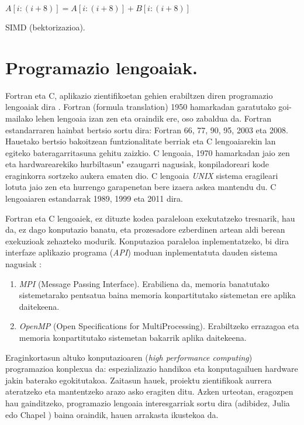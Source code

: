 \begin{algorithm}[H]
 \BlankLine
  {
   \BlankLine
    $A[i:(i+8)]=A[i:(i+8)]+B[i:(i+8)]$\;
   \BlankLine
  }
 \caption{SIMD (bektorizazioa).}
\end{algorithm}


\section{Programazio lengoaiak.}

Fortran eta C, aplikazio zientifikoetan gehien erabiltzen diren programazio lengoaiak dira \cite{Higham2015}. Fortran (formula translation) 1950 hamarkadan garatutako goi-mailako lehen lengoaia izan zen eta oraindik ere, oso zabaldua da. Fortran estandarraren hainbat bertsio 
sortu dira: Fortran 66, 77, 90, 95, 2003 eta 2008. Hauetako bertsio bakoitzean funtzionalitate berriak  eta C lengoaiarekin lan egiteko bateragarritasuna gehitu zaizkio.  C lengoaia, 1970 hamarkadan jaio zen eta hardwarearekiko hurbiltasun" ezaugarri nagusiak, konpiladoreari kode eraginkorra sortzeko aukera ematen dio. C lengoaia \emph{UNIX} sistema eragileari lotuta jaio zen eta hurrengo garapenetan bere izaera askea mantendu du. C lengoaiaren estandarrak 1989, 1999 eta 2011 dira.   

Fortran eta C lengoaiek, ez dituzte kodea paraleloan exekutatzeko tresnarik, hau da, ez dago konputazio banatu, eta prozesadore ezberdinen artean aldi berean exekuzioak zehazteko modurik. Konputazioa paraleloa inplementatzeko, bi dira interfaze aplikazio programa (\emph{API}) moduan inplementatuta dauden sistema nagusiak \cite{Pacheco2011}:

\begin{enumerate}
\item  \emph{MPI} (Message Passing Interface).
Erabiliena da, memoria banatutako sistemetarako pentsatua baina memoria konpartitutako sistemetan ere aplika daitekeena.

\item  \emph{OpenMP} (Open Specifications for MultiProcessing).
Erabiltzeko errazagoa eta memoria konpartitutako sistemetan bakarrik aplika daitekeena.

\end{enumerate}

Eraginkortasun altuko konputazioaren (\emph{high performance computing}) programazioa konplexua da: espezializazio handikoa  eta konputagailuen hardware jakin baterako egokitutakoa. Zaitasun hauek, proiektu zientifikoak aurrera ateratzeko eta mantentzeko arazo asko eragiten ditu. Azken urteotan, eragozpen hau gainditzeko, programazio lengoaia interesgarriak sortu dira (adibidez, Julia \cite{Bezanson2014} edo Chapel \cite{Balaji2015}) baina oraindik, hauen arrakasta ikustekoa da.


